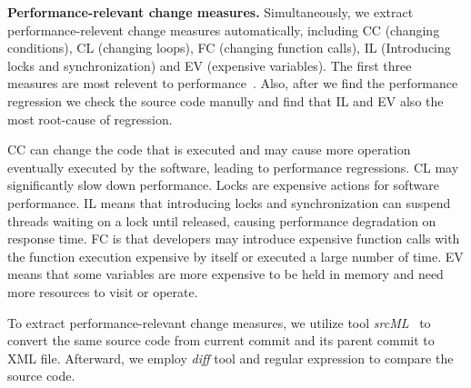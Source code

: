 \textbf{Performance-relevant change measures.} Simultaneously, we extract performance-relevent change measures automatically, including CC (changing conditions), CL (changing loops), FC (changing function calls), IL (Introducing locks and synchronization) and EV (expensive variables). The first three measures are most relevent to performance~\cite{ACM2016:Luo}. Also, after we find the performance regression we check the source code manully and find that IL and EV also the most root-cause of regression. 

CC can change the code that is executed and may cause more operation eventually executed by the software, leading to performance regressions. CL may significantly slow down performance. Locks are expensive actions for software performance. IL means that introducing locks and synchronization can suspend threads waiting on a lock until released, causing performance degradation on response time. FC is that developers may introduce expensive function calls with the function execution expensive by itself or executed a large number of time. EV means that some variables are more expensive to be held in memory and need more resources to visit or operate. 

To extract performance-relevant change measures, we utilize tool \emph{srcML}~\cite{srcml_2017} to convert the same source code from current commit and its parent commit to XML file. Afterward, we employ \emph{diff} tool and regular expression to compare the source code.

